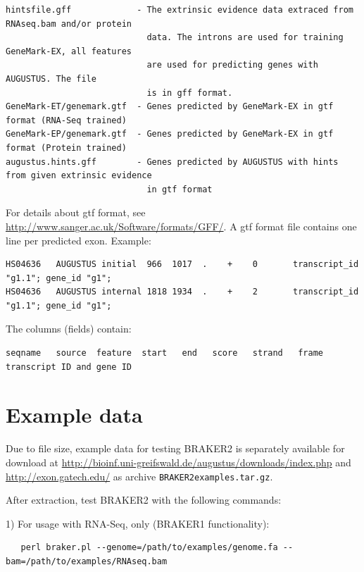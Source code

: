 \documentclass[a4paper,10pt]{report}
\begin{document}
\begin{verbatim}
hintsfile.gff             - The extrinsic evidence data extraced from RNAseq.bam and/or protein
                            data. The introns are used for training GeneMark-EX, all features
                            are used for predicting genes with AUGUSTUS. The file
                            is in gff format.
GeneMark-ET/genemark.gtf  - Genes predicted by GeneMark-EX in gtf format (RNA-Seq trained)
GeneMark-EP/genemark.gtf  - Genes predicted by GeneMark-EX in gtf format (Protein trained)
augustus.hints.gff        - Genes predicted by AUGUSTUS with hints from given extrinsic evidence
                            in gtf format

\end{verbatim}

For details about gtf format, see \url{http://www.sanger.ac.uk/Software/formats/GFF/}. A gtf format file
contains one line per predicted exon. Example:

\begin{verbatim}
HS04636   AUGUSTUS initial  966  1017  .    +    0       transcript_id "g1.1"; gene_id "g1";
HS04636   AUGUSTUS internal 1818 1934  .    +    2       transcript_id "g1.1"; gene_id "g1";
\end{verbatim}

The columns (fields) contain: 

\begin{verbatim}
seqname   source  feature  start   end   score   strand   frame  transcript ID and gene ID
\end{verbatim}


\chapter{Example data}


Due to file size, example data for testing BRAKER2 is separately available for download at 
\url{http://bioinf.uni-greifswald.de/augustus/downloads/index.php} and \url{http://exon.gatech.edu/} as archive
\texttt{BRAKER2examples.tar.gz}.

After extraction, test BRAKER2 with the following commands:

1) For usage with RNA-Seq, only (BRAKER1 functionality):

\begin{verbatim}
   perl braker.pl --genome=/path/to/examples/genome.fa --bam=/path/to/examples/RNAseq.bam
\end{verbatim}
\end{document}
